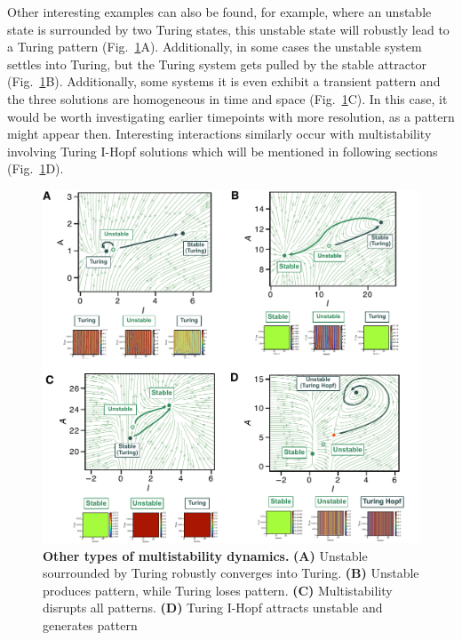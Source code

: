 Other interesting examples can also be found, for example, where an unstable state is surrounded by two Turing states, this unstable state will robustly lead to a Turing pattern (Fig.~\ref{fig:multistability_leftover}A).
Additionally, in some cases the unstable system settles into Turing, but the Turing system gets pulled by the stable attractor (Fig.~\ref{fig:multistability_leftover}B). Additionally, some systems it is even exhibit a transient pattern and the three solutions are homogeneous in time and space (Fig.~\ref{fig:multistability_leftover}C).
In this case, it would be worth investigating earlier timepoints with more resolution, as a pattern might appear then.
Interesting interactions similarly occur with multistability involving Turing I-Hopf solutions which will be mentioned in following sections (Fig.~\ref{fig:multistability_leftover}D).


\begin{figure}[H] %
    \centering
    \begin{adjustbox}{center}
    \includegraphics[width=1.2\textwidth]{chapters/Chapter 1/multistability_leftover} %
    \end{adjustbox}
    \caption{\textbf{Other types of multistability dynamics.} \textbf{(A)} Unstable sourrounded by Turing robustly converges into Turing. \textbf{(B)} Unstable produces pattern, while Turing loses pattern. \textbf{(C)} Multistability disrupts all patterns. \textbf{(D)} Turing I-Hopf attracts unstable and generates pattern}
    \label{fig:multistability_leftover} %
\end{figure}


